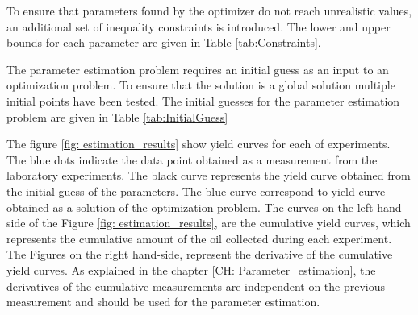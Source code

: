 \documentclass[../Article_Model_Parameters.tex]{subfiles}
\begin{document}
	To ensure that parameters found by the optimizer do not reach unrealistic values, an additional set of inequality constraints is introduced. The lower and upper bounds for each parameter are given in Table \ref{tab:Constraints}.

	\begin{table}[!h]
		\centering
	\caption{Constraints of the parameter estimation problem}
	\label{tab:Constraints}
	\end{table}

	The parameter estimation problem requires an initial guess as an input to an optimization problem. To ensure that the solution is a global solution multiple initial points have been tested. The initial guesses for the parameter estimation problem are given in Table \ref{tab:InitialGuess}
	
	\begin{table}[!h]
		\centering
		\caption{Constraints of the parameter estimation problem}
		\label{tab:InitialGuess}
	\end{table}
	
	The figure \ref{fig: estimation_results} show yield curves for each of experiments. The blue dots indicate the data point obtained as a measurement from the laboratory experiments. The black curve represents the yield curve obtained from the initial guess of the parameters. The blue curve correspond to yield curve obtained as a solution of the optimization problem. The curves on the left hand-side of the Figure \ref{fig: estimation_results}, are the cumulative yield curves, which represents the cumulative amount of the oil collected during each experiment. The Figures on the right hand-side, represent the derivative of the cumulative yield curves. As explained in the chapter \ref{CH: Parameter_estimation}, the derivatives of the cumulative measurements are independent on the previous measurement and should be used for the parameter estimation.
\end{document}
